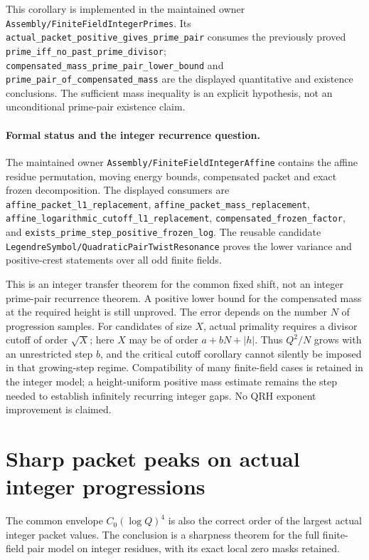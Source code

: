 \documentclass[11pt]{article}
\begin{document}
This corollary is implemented in the maintained owner
\texttt{Assembly/FiniteFieldIntegerPrimes}. Its
\texttt{actual\_packet\_positive\_gives\_prime\_pair} consumes the
previously proved
\texttt{prime\_iff\_no\_past\_prime\_divisor};
\texttt{compensated\_mass\_prime\_pair\_lower\_bound} and
\texttt{prime\_pair\_of\_compensated\_mass} are the displayed quantitative
and existence conclusions. The sufficient mass inequality is an
explicit hypothesis, not an unconditional prime-pair existence claim.

\paragraph{Formal status and the integer recurrence question.}
The maintained owner \texttt{Assembly/FiniteFieldIntegerAffine}
contains the affine residue permutation, moving energy bounds,
compensated packet and exact frozen decomposition.
The displayed consumers are
\texttt{affine\_packet\_l1\_replacement},
\texttt{affine\_packet\_mass\_replacement},
\texttt{affine\_logarithmic\_cutoff\_l1\_replacement},
\texttt{compensated\_frozen\_factor}, and
\texttt{exists\_prime\_step\_positive\_frozen\_log}.
The reusable candidate
\texttt{LegendreSymbol/QuadraticPairTwistResonance} proves the lower
variance and positive-crest statements over all odd finite fields.

This is an integer transfer theorem for the common fixed shift,
not an integer prime-pair recurrence theorem. A positive lower
bound for the compensated mass at the required height is still
unproved. The error depends on the number \(N\) of progression samples.
For candidates of size \(X\), actual primality requires a divisor
cutoff of order \(\sqrt X\); here \(X\) may be of order \(a+bN+|h|\).
Thus \(Q^2/N\) grows with an unrestricted step \(b\), and the critical
cutoff corollary cannot silently be imposed in that growing-step
regime. Compatibility of many finite-field cases is retained in
the integer model; a height-uniform positive mass estimate remains
the step needed to establish infinitely recurring integer gaps.
No QRH exponent improvement is claimed.

\section{Sharp packet peaks on actual integer progressions}
\label{sec:sharpIntegerPacketPeaks}

The common envelope \(C_0(\log Q)^4\) is also the correct order of
the largest actual integer packet values. The conclusion is a
sharpness theorem for the full finite-field pair model on integer
residues, with its exact local zero masks retained.
\end{document}
